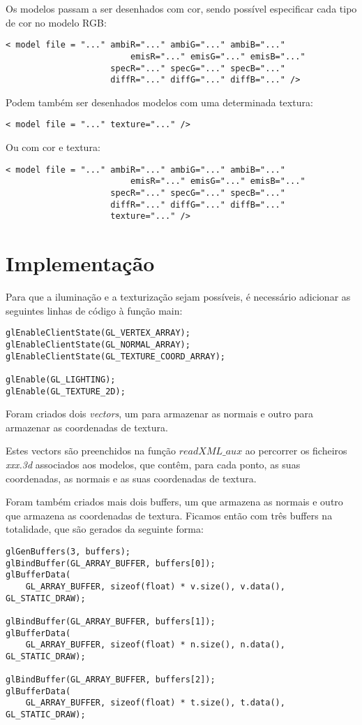 \documentclass[11pt,a4paper]{report}
\begin{document}
Os modelos passam a ser desenhados com cor, sendo possível especificar cada tipo de cor no modelo RGB:
\begin{lstlisting}[style = xml]
< model file = "..." ambiR="..." ambiG="..." ambiB="..."
		                 emisR="..." emisG="..." emisB="..."
                     specR="..." specG="..." specB="..."
                     diffR="..." diffG="..." diffB="..." />
\end{lstlisting}

Podem também ser desenhados modelos com uma determinada textura:
\begin{lstlisting}[style = xml]
< model file = "..." texture="..." />
\end{lstlisting}

Ou com cor e textura:
\begin{lstlisting}[style = xml]
< model file = "..." ambiR="..." ambiG="..." ambiB="..."
		                 emisR="..." emisG="..." emisB="..."
                     specR="..." specG="..." specB="..."
                     diffR="..." diffG="..." diffB="..."
                     texture="..." />
\end{lstlisting}

\section{Implementação}
Para que a iluminação e a texturização sejam possíveis, é necessário adicionar as seguintes linhas de código à função main:

\begin{lstlisting}[style = code]
glEnableClientState(GL_VERTEX_ARRAY);
glEnableClientState(GL_NORMAL_ARRAY);
glEnableClientState(GL_TEXTURE_COORD_ARRAY);

glEnable(GL_LIGHTING);
glEnable(GL_TEXTURE_2D);
\end{lstlisting}

Foram criados dois \emph{vectors}, um para armazenar as normais e outro para armazenar as coordenadas de textura.

Estes vectors são preenchidos na função {$readXML\_aux$} ao percorrer os ficheiros \emph{xxx.3d} associados aos modelos, que contêm, para cada ponto, as suas coordenadas, as normais e as suas coordenadas de textura.

Foram também criados mais dois buffers, um que armazena as normais e outro que armazena as coordenadas de textura.
\newpage
Ficamos então com três buffers na totalidade, que são gerados da seguinte forma:
\begin{lstlisting}[style = code]
glGenBuffers(3, buffers);
glBindBuffer(GL_ARRAY_BUFFER, buffers[0]);
glBufferData(
	GL_ARRAY_BUFFER, sizeof(float) * v.size(), v.data(), GL_STATIC_DRAW);

glBindBuffer(GL_ARRAY_BUFFER, buffers[1]);
glBufferData(
	GL_ARRAY_BUFFER, sizeof(float) * n.size(), n.data(), GL_STATIC_DRAW);

glBindBuffer(GL_ARRAY_BUFFER, buffers[2]);
glBufferData(
	GL_ARRAY_BUFFER, sizeof(float) * t.size(), t.data(), GL_STATIC_DRAW);
\end{lstlisting}
\end{document}
